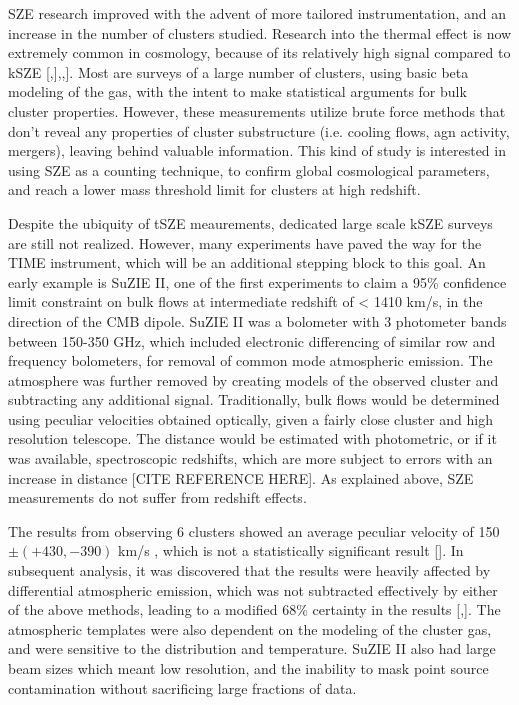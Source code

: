 \documentclass[manuscript]{aastex}
\begin{document}
SZE research improved with the advent of more tailored instrumentation, and an increase in the number of clusters studied. Research into the thermal effect is now extremely common in cosmology, because of its relatively high signal compared to kSZE [\cite{Benson2013},\cite{Saliwanchik2015}],\cite{Bleem2015},\cite{Planck2016}]. Most are surveys of a large number of clusters, using basic beta modeling of the gas, with the intent to make statistical arguments for bulk cluster properties. However, these measurements utilize brute force methods that don't reveal any properties of cluster substructure (i.e. cooling flows, agn activity, mergers), leaving behind valuable information. This kind of study is interested in using SZE as a counting technique, to confirm global cosmological parameters, and reach a lower mass threshold limit for clusters at high redshift. 

Despite the ubiquity of tSZE meaurements, dedicated large scale kSZE surveys are still not realized. However, many experiments have paved the way for the TIME instrument, which will be an additional stepping block to this goal. An early example is SuZIE II, one of the first experiments to claim a 95\% confidence limit constraint on bulk flows at intermediate redshift of < 1410 km/s, in the direction of the CMB dipole. SuZIE II was a bolometer with 3 photometer bands between 150-350 GHz, which included electronic differencing of similar row and frequency bolometers, for removal of common mode atmospheric emission. The atmosphere was further removed by creating models of the observed cluster and subtracting any additional signal. Traditionally, bulk flows would be determined using peculiar velocities obtained optically, given a fairly close cluster and high resolution telescope. The distance would be estimated with photometric, or if it was available, spectroscopic redshifts, which are more subject to errors with an increase in distance [CITE REFERENCE HERE]. As explained above, SZE measurements do not suffer from redshift effects. 

The results from observing 6 clusters showed an average peculiar velocity of 150 $\pm (+430,-390)$ km/s , which is not a statistically significant result [\cite{Benson2003}]. In subsequent analysis, it was discovered that the results were heavily affected by differential atmospheric emission, which was not subtracted effectively by either of the above methods, leading to a modified 68\% certainty in the results [\cite{Mauskopf2000},\cite{Carlstrom2002}]. The atmospheric templates were also dependent on the modeling of the cluster gas, and were sensitive to the distribution and temperature. SuZIE II also had large beam sizes which meant low resolution, and the inability to mask point source contamination without sacrificing large fractions of data. 
\end{document}
